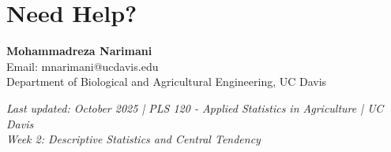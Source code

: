 \documentclass[11pt,a4paper]{article}
\begin{document}
\section{Need Help?}

\begin{infobox}
\textbf{Mohammadreza Narimani}\\
Email: mnarimani@ucdavis.edu\\
Department of Biological and Agricultural Engineering, UC Davis
\end{infobox}

\vfill

\begin{center}
\textit{Last updated: October 2025 | PLS 120 - Applied Statistics in Agriculture | UC Davis}\\
\textit{Week 2: Descriptive Statistics and Central Tendency}
\end{center}
\end{document}
